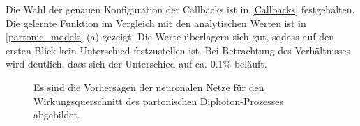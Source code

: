 Die Wahl der genauen Konfiguration der Callbacks ist in \textsf{\autoref{Callbacks}} festgehalten.
Die gelernte Funktion im Vergleich mit den analytischen Werten ist in \textsf{\autoref{partonic_models} (a)}  gezeigt. Die Werte überlagern sich gut, sodass auf den ersten Blick kein Unterschied festzustellen ist. Bei Betrachtung des Verhältnisses wird deutlich, dass sich der Unterschied auf ca. $0.1\%$ beläuft. 
\begin{figure}[hbt]
	\centering
	\caption{Es sind die Vorhersagen der neuronalen Netze für den Wirkungsquerschnitt des partonischen Diphoton-Prozesses abgebildet.}
	\label{partonic_models}
\end{figure}


